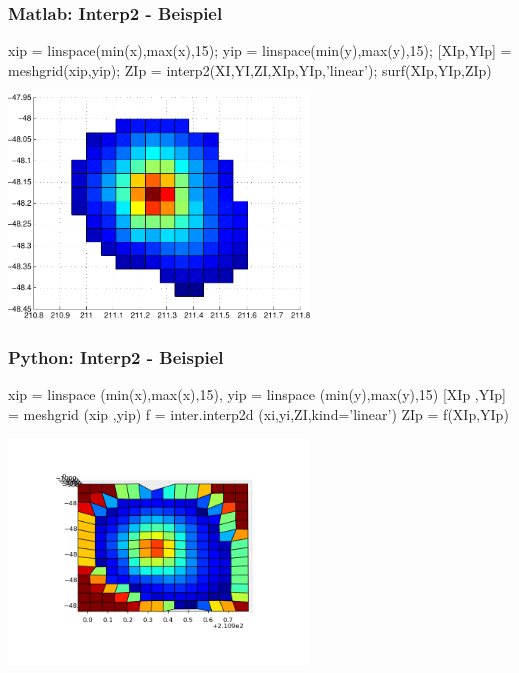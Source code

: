 \documentclass[hyperref={xetex}]{beamer}
\begin{document}
%
% 
\begin{frame}[fragile]\frametitle{Matlab: Interp2 - Beispiel}
\begin{matlabin}
xip = linspace(min(x),max(x),15); yip = linspace(min(y),max(y),15);
[XIp,YIp] = meshgrid(xip,yip);
ZIp = interp2(XI,YI,ZI,XIp,YIp,'linear');
surf(XIp,YIp,ZIp)
\end{matlabin}
\begin{center}
\includegraphics[width=0.6\textwidth]{figures/beispiel_interp2_plot}
\end{center}
\end{frame}

%
\begin{frame}[fragile]\frametitle{Python: Interp2 - Beispiel}
\begin{pyin}
xip = linspace (min(x),max(x),15), yip = linspace (min(y),max(y),15)
[XIp ,YIp] = meshgrid (xip ,yip)
f = inter.interp2d (xi,yi,ZI,kind='linear')  
ZIp = f(XIp,YIp)
\end{pyin}
\begin{center}
\includegraphics[width=0.6\textwidth]{figures/beispiel_interp2_pyplot}
\end{center}
\end{frame}
\end{document}
